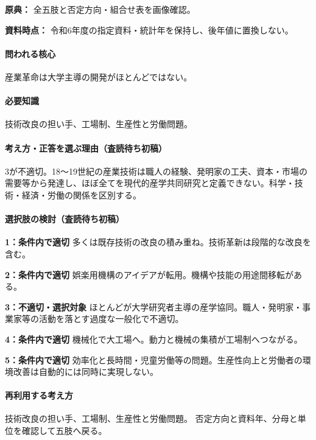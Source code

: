 \noindent\textbf{原典：} 全五肢と否定方向・組合せ表を画像確認。\par

\noindent\textbf{資料時点：} 令和6年度の指定資料・統計年を保持し、後年値に置換しない。\par

\paragraph{問われる核心} 産業革命は大学主導の開発がほとんどではない。

\paragraph{必要知識} 技術改良の担い手、工場制、生産性と労働問題。

\paragraph{考え方・正答を選ぶ理由（査読待ち初稿）} 3が不適切。18〜19世紀の産業技術は職人の経験、発明家の工夫、資本・市場の需要等から発達し、ほぼ全てを現代的産学共同研究と定義できない。科学・技術・経済・労働の関係を区別する。

\paragraph{選択肢の検討（査読待ち初稿）}\mbox{}\par

\noindent\textbf{1：条件内で適切} 多くは既存技術の改良の積み重ね。技術革新は段階的な改良を含む。\par

\noindent\textbf{2：条件内で適切} 娯楽用機構のアイデアが転用。機構や技能の用途間移転がある。\par

\noindent\textbf{3：不適切・選択対象} ほとんどが大学研究者主導の産学協同。職人・発明家・事業家等の活動を落とす過度な一般化で不適切。\par

\noindent\textbf{4：条件内で適切} 機械化で大工場へ。動力と機械の集積が工場制へつながる。\par

\noindent\textbf{5：条件内で適切} 効率化と長時間・児童労働等の問題。生産性向上と労働者の環境改善は自動的には同時に実現しない。\par

\paragraph{再利用する考え方} 技術改良の担い手、工場制、生産性と労働問題。 否定方向と資料年、分母と単位を確認して五肢へ戻る。

